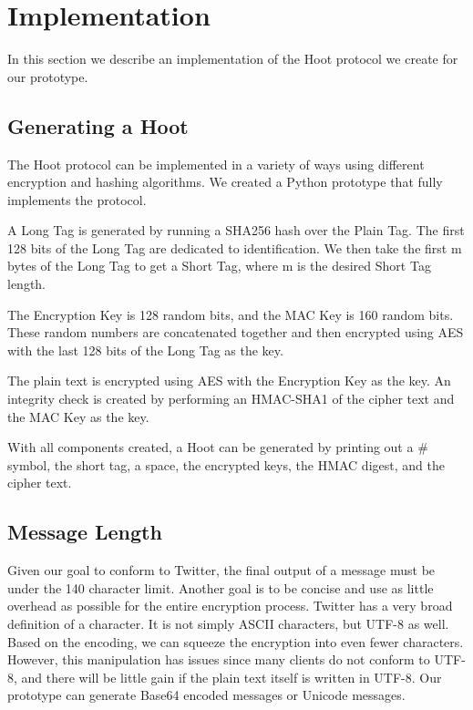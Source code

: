 \section{Implementation}

In this section we describe an implementation of the Hoot protocol we create for our prototype.

\subsection{Generating a Hoot}

The Hoot protocol can be implemented in a variety of ways using different encryption and hashing algorithms. We created a Python prototype that fully implements the protocol.

A Long Tag is generated by running a SHA256 hash over the Plain Tag. The first 128 bits of the Long Tag are dedicated to identification. We then take the first m bytes of the Long Tag to get a Short Tag, where m is the desired Short Tag length.

The Encryption Key is 128 random bits, and the MAC Key is 160 random bits. These random numbers are concatenated together and then encrypted using AES with the last 128 bits of the Long Tag as the key.

The plain text is encrypted using AES with the Encryption Key as the key. An integrity check is created by performing an HMAC-SHA1 of the cipher text and the MAC Key as the key.

With all components created, a Hoot can be generated by printing out a \# symbol,  the short tag, a space, the encrypted keys, the HMAC digest, and the cipher text.

\subsection{Message Length}

Given our goal to conform to Twitter, the final output of a message must be under the 140 character limit. Another goal is to be concise and use as little overhead as possible for the entire encryption process. Twitter has a very broad definition of a character. It is not simply ASCII characters, but UTF-8 as well. Based on the encoding, we can squeeze the encryption into even fewer characters. However, this manipulation has issues since many clients do not conform to UTF-8, and there will be little gain if the plain text itself is written in UTF-8. Our prototype can generate Base64 encoded messages or Unicode messages.

